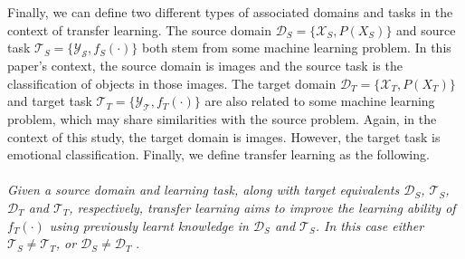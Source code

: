 Finally, we can define two different types of associated domains and tasks in the context of transfer learning. The source domain $\mathcal{D}_S = \{ \mathcal{X}_S, P(X_S) \}$ and source task $\mathcal{T}_S = \{ \mathcal{Y_S}, f_S(\cdot) \}$ both stem from some machine learning problem. In this paper's context, the source domain is images and the source task is the classification of objects in those images. The target domain $\mathcal{D}_T = \{ \mathcal{X}_T, P(X_T) \}$ and target task $\mathcal{T}_T = \{ \mathcal{Y_T}, f_T(\cdot) \}$ are also related to some machine learning problem, which may share similarities with the source problem. Again, in the context of this study, the target domain is images. However, the target task is emotional classification. Finally, we define transfer learning as the following.\\ \\
\textit{Given a source domain and learning task, along with target equivalents $\mathcal{D}_S$, $\mathcal{T}_S$, $\mathcal{D}_T$ and $\mathcal{T}_T$, respectively,  transfer learning aims to improve the learning ability of $f_T(\cdot)$ using previously learnt knowledge in $\mathcal{D}_S$ and $\mathcal{T}_S$. In this case either $\mathcal{T}_S \neq \mathcal{T}_T$, or $\mathcal{D}_S \neq \mathcal{D}_T$} \cite{IEEE_TL_Survey}.\\ \\







